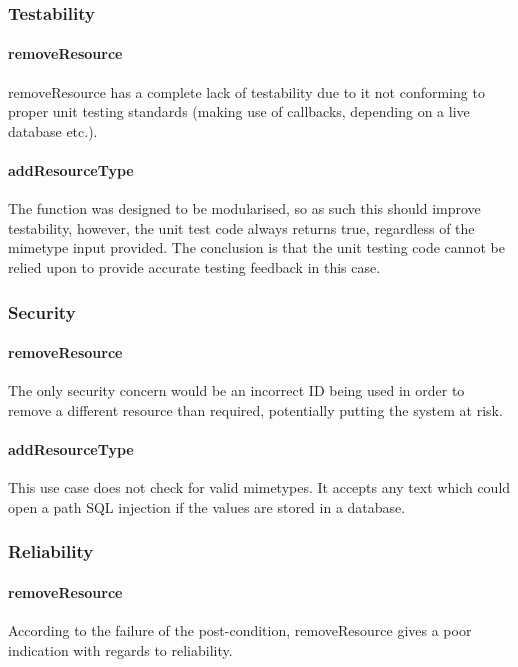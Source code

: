 \documentclass[a4paper]{article}
\begin{document}
\subsubsection {Testability}

\paragraph{removeResource}
removeResource has a complete lack of testability due to it not conforming to proper unit testing standards (making use of callbacks, depending on a live database etc.).

\paragraph{addResourceType}
The function was designed to be modularised, so as such this should improve testability, 
however, the unit test code always returns true, regardless of the mimetype input provided. 
The conclusion is that the unit testing code cannot be relied upon to provide accurate testing 
feedback in this case.

\subsubsection {Security}

\paragraph{removeResource}
The only security concern would be an incorrect ID being used in order to remove a different resource than required, potentially putting the system at risk.

\paragraph{addResourceType}
 This use case does not check for valid mimetypes. 
 It accepts any text which could open a path SQL injection if the values are stored in a database.  

\subsubsection {Reliability}

\paragraph{removeResource}
According to the failure of the post-condition, removeResource gives a poor indication with regards to reliability.
\end{document}
